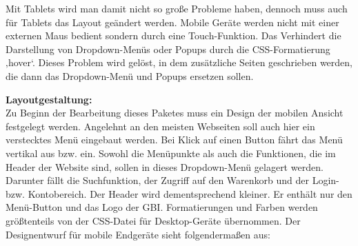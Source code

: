Mit Tablets wird man damit nicht so große Probleme haben, dennoch muss auch für Tablets das Layout geändert werden. 
Mobile Geräte werden nicht mit einer externen Maus bedient sondern durch eine Touch-Funktion. Das Verhindert die Darstellung von Dropdown-Menüs oder Popups durch die CSS-Formatierung ‚hover‘. Dieses Problem wird gelöst, in dem zusätzliche Seiten geschrieben werden, die dann das Dropdown-Menü und Popups ersetzen sollen.

\newpage
\textbf{Layoutgestaltung:}\\
Zu Beginn der Bearbeitung dieses Paketes muss ein Design der mobilen Ansicht festgelegt werden. Angelehnt an den meisten Webseiten soll auch hier ein verstecktes Menü eingebaut werden. Bei Klick auf einen Button fährt das Menü vertikal aus bzw. ein. Sowohl die Menüpunkte als auch die Funktionen, die im Header der Website sind, sollen in dieses Dropdown-Menü gelagert werden. Darunter fällt die Suchfunktion, der Zugriff auf den Warenkorb und der Login- bzw. Kontobereich. Der Header wird dementsprechend kleiner. Er enthält nur den Menü-Button und das Logo der GBI.
Formatierungen und Farben werden größtenteils von der CSS-Datei für Desktop-Geräte übernommen. 
Der Designentwurf für mobile Endgeräte sieht folgendermaßen aus:

